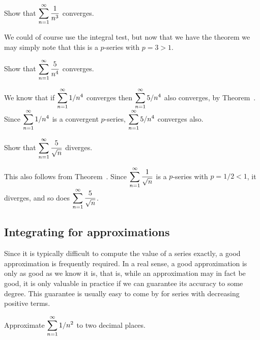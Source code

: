 \begin{example} Show that $\displaystyle\sum_{n=1}^\infty {1\over {n^3}}$ converges. 
\end{example}

\begin{solution}
We could of course use
the integral test, but now that we have the theorem we may simply note
that this is a $p$-series with $p = 3>1$.
\end{solution}

\begin{example} Show that $\displaystyle\sum_{n=1}^\infty {5\over n^4}$ converges. 
\end{example}
\begin{solution}
We know that if
$\displaystyle \sum_{n=1}^\infty 1/n^4$ converges then $\displaystyle \sum_{n=1}^\infty 5/n^4$
also converges, by Theorem~. Since 
$\displaystyle \sum_{n=1}^\infty 1/n^4$ is a convergent $p$-series, 
 $\displaystyle \sum_{n=1}^\infty 5/n^4$ converges also.
\end{solution}

\begin{example} Show that $\displaystyle\sum_{n=1}^\infty {5\over \sqrt{n}}$ diverges.
\end{example}
\begin{solution}
This also follows from
Theorem~.  Since $\displaystyle\sum_{n=1}^\infty
{1\over \sqrt{n}}$ is a $p$-series with $p=1/2<1$, it diverges, and so
does $\displaystyle\sum_{n=1}^\infty {5\over \sqrt{n}}$.  
\end{solution}

\subsection{Integrating for approximations}

Since it is typically difficult to compute the value of a series
exactly, a good approximation is frequently required. In a real sense,
a good approximation is only as good as we know it is, that is, while
an approximation may in fact be good, it is only valuable in practice
if we can guarantee its accuracy to some degree. This guarantee is
usually easy to come by for series with decreasing positive terms.

\begin{example}
  \label{example:approximate-sum-one-over-n-squared}
  Approximate $\displaystyle \sum_{n=1}^\infty 1/n^2$ to two decimal places.
\end{example}

